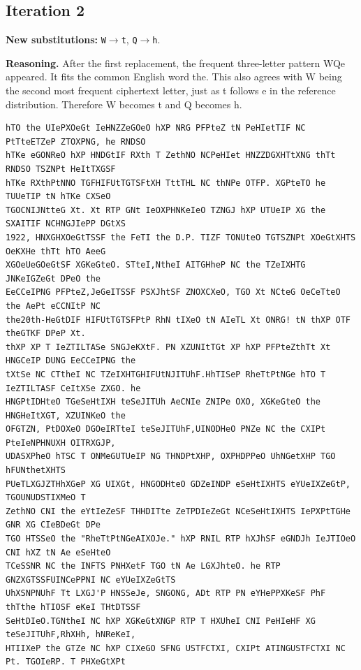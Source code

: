 \documentclass[12pt,a4paper]{article}
\begin{document}
\subsection{Iteration 2}

\noindent\textbf{New substitutions:} \texttt{W}$\rightarrow$\texttt{t}, \texttt{Q}$\rightarrow$\texttt{h}.\par
\smallskip
\noindent\textbf{Reasoning.} After the first replacement, the frequent three-letter pattern WQe appeared. It fits the common English word the. This also agrees with W being the second most frequent ciphertext letter, just as t follows e in the reference distribution. Therefore W becomes t and Q becomes h.

\begin{lstlisting}[style=ciphertext,caption={Complete text after iteration 2}]
hTO the UIePXOeGt IeHNZZeGOeO hXP NRG PFPteZ tN PeHIetTIF NC PtTteETZeP ZTOXPNG, he RNDSO
hTKe eGONReO hXP HNDGtIF RXth T ZethNO NCPeHIet HNZZDGXHTtXNG thTt RNDSO TSZNPt HeItTXGSF
hTKe RXthPtNNO TGFHIFUtTGTSFtXH TttTHL NC thNPe OTFP. XGPteTO he TUUeTIP tN hTKe CXSeO
TGOCNIJNtteG Xt. Xt RTP GNt IeOXPHNKeIeO TZNGJ hXP UTUeIP XG the SXAITIF NCHNGJIePP DGtXS
1922, HNXGHXOeGtTSSF the FeTI the D.P. TIZF TONUteO TGTSZNPt XOeGtXHTS OeKXHe thTt hTO AeeG
XGOeUeGOeGtSF XGKeGteO. STteI,NtheI AITGHheP NC the TZeIXHTG JNKeIGZeGt DPeO the
EeCCeIPNG PFPteZ,JeGeITSSF PSXJhtSF ZNOXCXeO, TGO Xt NCteG OeCeTteO the AePt eCCNItP NC
the20th-HeGtDIF HIFUtTGTSFPtP RhN tIXeO tN AIeTL Xt ONRG! tN thXP OTF theGTKF DPeP Xt.
thXP XP T IeZTILTASe SNGJeKXtF. PN XZUNItTGt XP hXP PFPteZthTt Xt HNGCeIP DUNG EeCCeIPNG the
tXtSe NC CTtheI NC TZeIXHTGHIFUtNJITUhF.HhTISeP RheTtPtNGe hTO T IeZTILTASF CeItXSe ZXGO. he
HNGPtIDHteO TGeSeHtIXH teSeJITUh AeCNIe ZNIPe OXO, XGKeGteO the HNGHeItXGT, XZUINKeO the
OFGTZN, PtDOXeO DGOeIRTteI teSeJITUhF,UINODHeO PNZe NC the CXIPt PteIeNPHNUXH OITRXGJP,
UDASXPheO hTSC T ONMeGUTUeIP NG THNDPtXHP, OXPHDPPeO UhNGetXHP TGO hFUNthetXHTS
PUeTLXGJZTHhXGeP XG UIXGt, HNGODHteO GDZeINDP eSeHtIXHTS eYUeIXZeGtP, TGOUNUDSTIXMeO T
ZethNO CNI the eYtIeZeSF THHDITte ZeTPDIeZeGt NCeSeHtIXHTS IePXPtTGHe GNR XG CIeBDeGt DPe
TGO HTSSeO the "RheTtPtNGeAIXOJe." hXP RNIL RTP hXJhSF eGNDJh IeJTIOeO CNI hXZ tN Ae eSeHteO
TCeSSNR NC the INFTS PNHXetF TGO tN Ae LGXJhteO. he RTP GNZXGTSSFUINCePPNI NC eYUeIXZeGtTS
UhXSNPNUhF Tt LXGJ'P HNSSeJe, SNGONG, ADt RTP PN eYHePPXKeSF PhF thTthe hTIOSF eKeI THtDTSSF
SeHtDIeO.TGNtheI NC hXP XGKeGtXNGP RTP T HXUheI CNI PeHIeHF XG teSeJITUhF,RhXHh, hNReKeI,
HTIIXeP the GTZe NC hXP CIXeGO SFNG USTFCTXI, CXIPt ATINGUSTFCTXI NC Pt. TGOIeRP. T PHXeGtXPt

\end{lstlisting}
\end{document}
